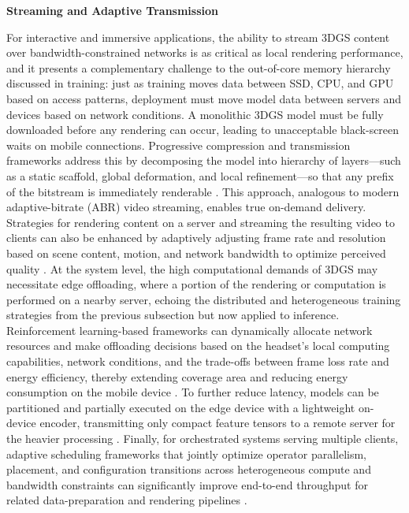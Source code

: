 \documentclass[11pt]{article}
\begin{document}
\textbf{Streaming and Adaptive Transmission}

For interactive and immersive applications, the ability to stream 3DGS content over bandwidth-constrained networks is as critical as local rendering performance, and it presents a complementary challenge to the out-of-core memory hierarchy discussed in training: just as training moves data between SSD, CPU, and GPU based on access patterns, deployment must move model data between servers and devices based on network conditions. A monolithic 3DGS model must be fully downloaded before any rendering can occur, leading to unacceptable black-screen waits on mobile connections. Progressive compression and transmission frameworks address this by decomposing the model into hierarchy of layers---such as a static scaffold, global deformation, and local refinement---so that any prefix of the bitstream is immediately renderable \cite{ref414}. This approach, analogous to modern adaptive-bitrate (ABR) video streaming, enables true on-demand delivery. Strategies for rendering content on a server and streaming the resulting video to clients can also be enhanced by adaptively adjusting frame rate and resolution based on scene content, motion, and network bandwidth to optimize perceived quality \cite{ref488}. At the system level, the high computational demands of 3DGS may necessitate edge offloading, where a portion of the rendering or computation is performed on a nearby server, echoing the distributed and heterogeneous training strategies from the previous subsection but now applied to inference. Reinforcement learning-based frameworks can dynamically allocate network resources and make offloading decisions based on the headset's local computing capabilities, network conditions, and the trade-offs between frame loss rate and energy efficiency, thereby extending coverage area and reducing energy consumption on the mobile device \cite{ref489}. To further reduce latency, models can be partitioned and partially executed on the edge device with a lightweight on-device encoder, transmitting only compact feature tensors to a remote server for the heavier processing \cite{ref490}. Finally, for orchestrated systems serving multiple clients, adaptive scheduling frameworks that jointly optimize operator parallelism, placement, and configuration transitions across heterogeneous compute and bandwidth constraints can significantly improve end-to-end throughput for related data-preparation and rendering pipelines \cite{ref491}.
\end{document}
